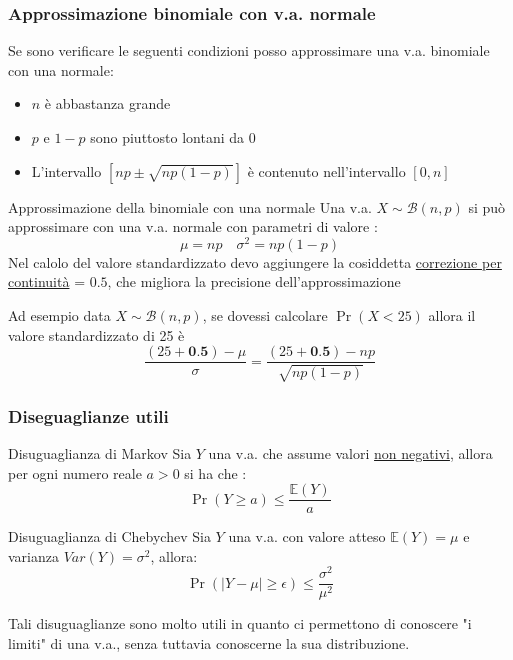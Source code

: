 \subsubsection*{Approssimazione binomiale con v.a. normale}
Se sono verificare le seguenti condizioni posso approssimare una v.a. binomiale con una normale:
\begin{itemize}
	\item $ n $ è abbastanza grande
	\item $ p $ e $ 1-p $ sono piuttosto lontani da 0
	\item L'intervallo $ \left[np \pm \sqrt{np\left(1-p\right)}\right] $ è contenuto nell'intervallo $ \left[0,n\right] $
\end{itemize}
\begin{teorema}{Approssimazione della binomiale con una normale}
	Una v.a. $ X \sim \mathcal{B}\left(n,p\right) $ si può approssimare con una v.a. normale con parametri di valore :
	\[
		\mu  = np \quad  \sigma ^2  = np\left(1-p\right)
	\]
	Nel calolo del valore standardizzato devo aggiungere la cosiddetta \underline{correzione per continuità} = $ 0.5 $, che migliora la precisione dell'approssimazione
\end{teorema}
Ad esempio data $ X \sim \mathcal{B}\left(n, p\right) $, se dovessi calcolare $ \Pr \left(X < 25\right) $ allora il valore standardizzato di 25 è
\[
	\frac{\left(25 + \textbf{0.5}\right) - \mu }{ \sigma } =  \frac{\left(25 + \textbf{0.5}\right) - np}{\sqrt{np\left(1-p\right)}}
\]
\subsubsection*{Diseguaglianze utili}
\begin{teorema}{Disuguaglianza di Markov}
	Sia $ Y $ una v.a. che assume valori \underline{non negativi}, allora per ogni numero reale $ a > 0 $ si ha che :
	\[
		\Pr \left(Y \ge  a\right) \le  \frac{\mathbb{E}\left(Y\right)}{a}
	\]
\end{teorema}
\begin{teorema}{Disuguaglianza di Chebychev}
	Sia $ Y $ una v.a. con valore atteso $ \mathbb{E}\left(Y\right) = \mu  $ e varianza $ Var \left(Y\right) = \sigma ^2  $, allora:
	\[
		\Pr \left(\left|Y - \mu \right| \ge  \epsilon \right) \le  \frac{\sigma  ^2 }{ \mu^2 }
	\]
\end{teorema}
Tali disuguaglianze sono molto utili in quanto ci permettono di conoscere "i limiti" di una v.a., senza tuttavia conoscerne la sua distribuzione.
